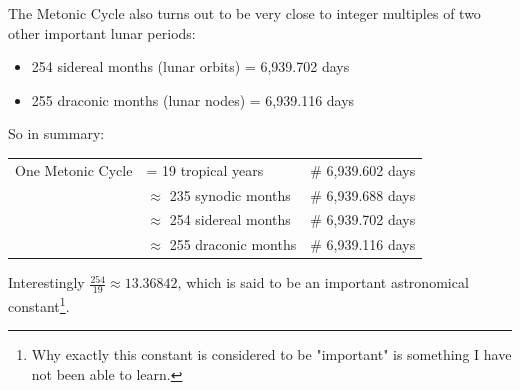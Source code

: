 \documentclass{article}
\theoremstyle{definition}
\begin{document}
\bigskip
\noindent
The Metonic Cycle also turns out to be very close to integer
multiples of two other important lunar periods: 

\bigskip
\begin{itemize}
  \item 254 sidereal months (lunar orbits) = 6,939.702 days
  \item 255 draconic months (lunar nodes) = 6,939.116 days
\end{itemize}

\bigskip
\noindent
So in  summary: 

\begin{flushleft}
\begin{tabular}{@{}l@{\ }l@{\qquad}l}
  One Metonic Cycle
  & = 19 tropical years                 &\hspace{3em} \# 6,939.602 days \\
  & $\approx$ 235 synodic months        &\hspace{3em} \# 6,939.688 days \\
  & $\approx$ 254 sidereal months       &\hspace{3em} \# 6,939.702 days \\
  & $\approx$ 255 draconic months       &\hspace{3em} \# 6,939.116 days
\end{tabular}
\end{flushleft}




\bigskip
\noindent
Interestingly $\frac{254}{19} \approx 13.36842$, which is said to
be an important astronomical constant\footnote{Why exactly this
constant is considered to be "important" is something I have not
been able to learn.}.
\end{document}
